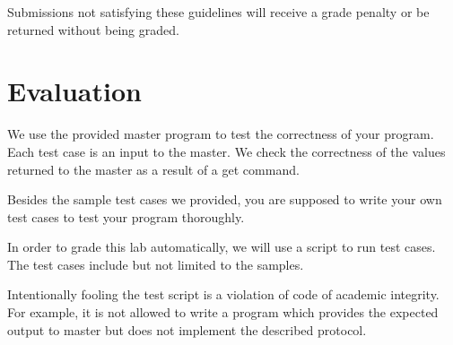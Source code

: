 \documentclass[11pt]{article}
\begin{document}
    Submissions not satisfying these guidelines will receive a grade penalty or be returned without being graded.

    \section{Evaluation}\label{sec:evaluation}
    \begin{compactitem}
        \item We use the provided master program to test the correctness of your program.
        Each test case is an input to the master.
        We check the correctness of the values returned to the master as a result of a get command.
        \item Besides the sample test cases we provided, you are supposed to write your own test cases to test your program thoroughly.
        \item In order to grade this lab automatically, we will use a script to run test cases.
        The test cases include but not limited to the samples.
        \item Intentionally fooling the test script is a violation of code of academic integrity.
        For example, it is not allowed to write a program which provides the expected output to master but does not implement the described protocol.
    \end{compactitem}
\end{document}
